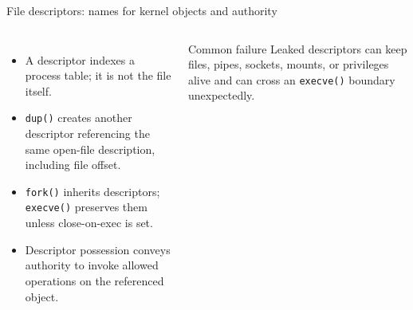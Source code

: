 \documentclass[aspectratio=169,11pt]{beamer}
\newcommand{\code}[1]{\texttt{#1}}
\begin{document}
\begin{frame}{File descriptors: names for kernel objects and authority}
  \small
  \begin{columns}[T,onlytextwidth]
      \centering
      \begin{itemize}
        \item A descriptor indexes a process table; it is not the file itself.
        \item \code{dup()} creates another descriptor referencing the same open-file description, including file offset.
        \item \code{fork()} inherits descriptors; \code{execve()} preserves them unless close-on-exec is set.
        \item Descriptor possession conveys authority to invoke allowed operations on the referenced object.
      \end{itemize}
      \begin{alertblock}{Common failure}
        Leaked descriptors can keep files, pipes, sockets, mounts, or privileges alive and can cross an \code{execve()} boundary unexpectedly.
      \end{alertblock}
  \end{columns}
\end{frame}
\end{document}
